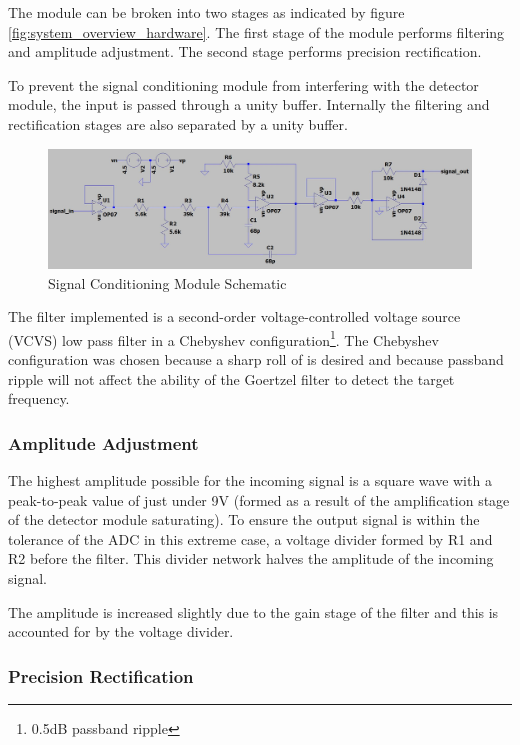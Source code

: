 The module can be broken into two stages as indicated by figure \ref{fig:system_overview_hardware}. The first stage of the module performs filtering and amplitude adjustment. The second stage performs precision rectification.

To prevent the signal conditioning module from interfering with the detector module, the input is passed through a unity buffer. Internally the filtering and rectification stages are also separated by a unity buffer.

\begin{figure}[H]
	\centering
	\includegraphics[width=\textwidth]{figures/design/filter_and_rectify}
	\caption{Signal Conditioning Module Schematic}
	\label{fig:schematic_filter_and_rectify}
\end{figure}

The filter implemented is a second-order voltage-controlled voltage source (VCVS) low pass filter in a Chebyshev configuration\footnote{0.5dB passband ripple}. The Chebyshev configuration was chosen because a sharp roll of is desired and because passband ripple will not affect the ability of the Goertzel filter to detect the target frequency.


\subsubsection{Amplitude Adjustment}
The highest amplitude possible for the incoming signal is a square wave with a peak-to-peak value of just under 9V (formed as a result of the amplification stage of the detector module saturating). To ensure the output signal is within the tolerance of the ADC in this extreme case, a voltage divider formed by R1 and R2 before the filter. This divider network halves the amplitude of the incoming signal.

The amplitude is increased slightly due to the gain stage of the filter and this is accounted for by the voltage divider.

\subsubsection{Precision Rectification}

